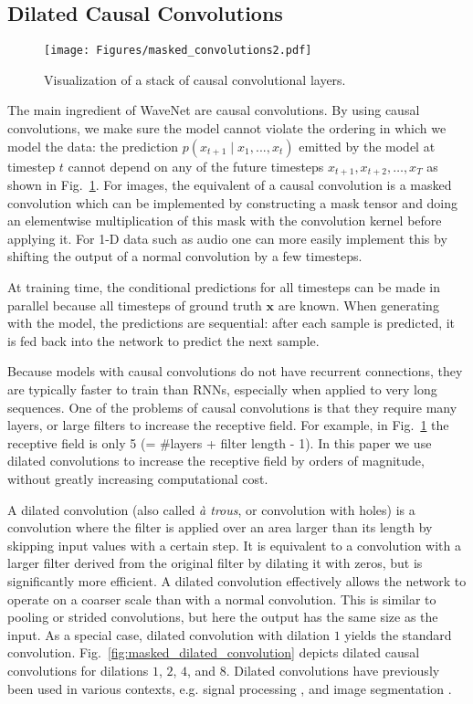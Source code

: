 \documentclass{article}
\makeatletter
\renewcommand{\vec}{\mathbf}
\newcommand{\figref}[1]{Fig.~\ref{#1}}
\newcommand*{\eg}{e.g.\@\xspace}
\makeatother
\begin{document}
\subsection{Dilated Causal Convolutions}

\begin{figure}[h]
\centering
\texttt{[image: Figures/masked\_convolutions2.pdf]}
\caption{Visualization of a stack of causal convolutional layers.}
\label{fig:masked_convolution}
\end{figure}

The main ingredient of WaveNet are causal convolutions. By using causal convolutions, we make sure the model cannot violate the ordering in which we model the data: the prediction $p\left(x_{t+1} \mid x_1,...,x_{t}\right)$ emitted by the model at timestep $t$ cannot depend on any of the future timesteps $x_{t+1}, x_{t+2},\dots,x_T$ as shown in \figref{fig:masked_convolution}. For images, the equivalent of a causal convolution is a masked convolution \citep{van2016pixel} which can be implemented by constructing a mask tensor and doing an elementwise multiplication of this mask with the convolution kernel before applying it. For 1-D data such as audio one can more easily implement this by shifting the output of a normal convolution by a few timesteps. 

At training time, the conditional predictions for all timesteps can be made in parallel because all timesteps of ground truth $\vec{x}$ are known. When generating with the model, the predictions are sequential: after each sample is predicted, it is fed back into the network to predict the next sample.

Because models with causal convolutions do not have recurrent connections, they are typically faster to train than RNNs, especially when applied to very long sequences. One of the problems of causal convolutions is that they require many layers, or large filters to increase the receptive field. For example, in \figref{fig:masked_convolution} the receptive field is only 5 (= \#layers + filter length - 1). In this paper we use dilated convolutions to increase the receptive field by orders of magnitude, without greatly increasing computational cost. 

A dilated convolution (also called \emph{\`a trous}, or convolution with holes) is a convolution where the filter is applied over an area larger than its length by skipping input values with a certain step. It is equivalent to a convolution with a larger filter derived from the original filter by dilating it with zeros, but is significantly more efficient. A dilated convolution effectively allows the network to operate on a coarser scale than with a normal convolution. This is similar to pooling or strided convolutions, but here the output has the same size as the input. As a special case, dilated convolution with dilation $1$ yields the standard convolution.  \figref{fig:masked_dilated_convolution} depicts dilated causal convolutions for dilations $1$, $2$, $4$, and $8$. Dilated convolutions have previously been used in various contexts, \eg signal processing \citep{Holschneider1989,Dutilleux1989}, and image segmentation \citep{chen14semantic,YuKoltun2016}.
\end{document}
